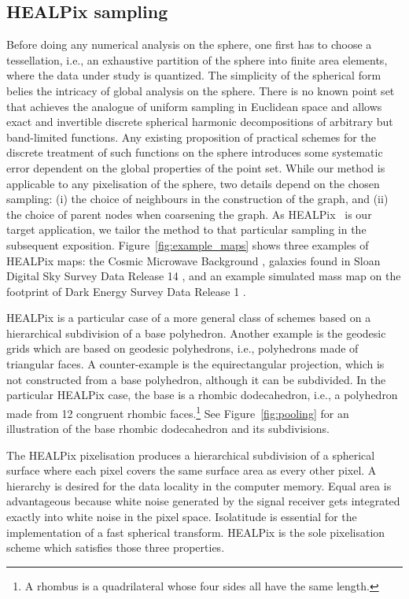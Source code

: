 \documentclass[final,twocolumn,3p,times,sort&compress]{elsarticle}
\newcommand{\figref}[1]{Figure~\ref{fig:#1}}
\newcommand{\1}{\b{1}}              %
\newcommand{\0}{\b{0}}              %
\begin{document}
\subsection{HEALPix sampling}
\label{sec:healpix}

Before doing any numerical analysis on the sphere, one first has to choose a tessellation, i.e., an exhaustive partition of the sphere into finite area elements, where the data under study is quantized.
The simplicity of the spherical form belies the intricacy of global analysis on the sphere.
There is no known point set that achieves the analogue of uniform sampling in Euclidean space and allows exact and invertible discrete spherical harmonic decompositions of arbitrary but band-limited functions.
Any existing proposition of practical schemes for the discrete treatment of such functions on the sphere introduces some systematic error dependent on the global properties of the point set.
While our method is applicable to any pixelisation of the sphere, two details depend on the chosen sampling: (i) the choice of neighbours in the construction of the graph, and (ii) the choice of parent nodes when coarsening the graph.
As HEALPix~\citep{gorski2005healpix} is our target application, we tailor the method to that particular sampling in the subsequent exposition.
\figref{example_maps} shows three examples of HEALPix maps: the Cosmic Microwave Background \citep{planck2015overview}, galaxies found in Sloan Digital Sky Survey Data Release 14 \citep{abolfathi2017sdssDR14}, and an example simulated mass map on the footprint of Dark Energy Survey Data Release 1 \citep{des2018dr1}.

HEALPix is a particular case of a more general class of schemes based on a hierarchical subdivision of a base polyhedron.
Another example is the geodesic grids which are based on geodesic polyhedrons, i.e., polyhedrons made of triangular faces. A counter-example is the equirectangular projection, which is not constructed from a base polyhedron, although it can be subdivided.
In the particular HEALPix case, the base is a rhombic dodecahedron, i.e., a polyhedron made from 12 congruent rhombic faces.\footnote{A rhombus is a quadrilateral whose four sides all have the same length.}
See \figref{pooling} for an illustration of the base rhombic dodecahedron and its subdivisions.

The HEALPix pixelisation produces a hierarchical subdivision of a spherical surface where each pixel covers the same surface area as every other pixel.
A hierarchy is desired for the data locality in the computer memory.
Equal area is advantageous because white noise generated by the signal receiver gets integrated exactly into white noise in the pixel space.
Isolatitude is essential for the implementation of a fast spherical transform.
HEALPix is the sole pixelisation scheme which satisfies those three properties.
\end{document}
